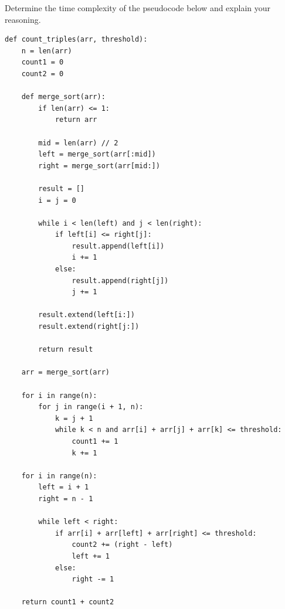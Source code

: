 \problem{}
Determine the time complexity of the pseudocode below and explain your reasoning.

\begin{lstlisting}
def count_triples(arr, threshold):
    n = len(arr)
    count1 = 0
    count2 = 0

    def merge_sort(arr):
        if len(arr) <= 1:
            return arr
        
        mid = len(arr) // 2
        left = merge_sort(arr[:mid])
        right = merge_sort(arr[mid:])
        
        result = []
        i = j = 0
        
        while i < len(left) and j < len(right):
            if left[i] <= right[j]:
                result.append(left[i])
                i += 1
            else:
                result.append(right[j])
                j += 1
        
        result.extend(left[i:])
        result.extend(right[j:])
        
        return result

    arr = merge_sort(arr)

    for i in range(n):
        for j in range(i + 1, n):
            k = j + 1
            while k < n and arr[i] + arr[j] + arr[k] <= threshold:
                count1 += 1
                k += 1

    for i in range(n):
        left = i + 1
        right = n - 1
        
        while left < right:
            if arr[i] + arr[left] + arr[right] <= threshold:
                count2 += (right - left)
                left += 1
            else:
                right -= 1

    return count1 + count2
\end{lstlisting}

\solution{
}
\newpage